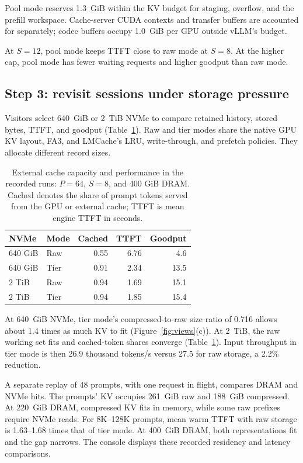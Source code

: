\documentclass[conference]{IEEEtran}
\begin{document}
Pool mode reserves 1.3~GiB within the KV budget for staging, overflow, and
the prefill workspace. Cache-server CUDA contexts and transfer buffers are
accounted for separately; codec buffers occupy 1.0~GiB per GPU outside
vLLM's budget.

At $S=12$, pool mode keeps TTFT close to raw mode at $S=8$.
At the higher cap, pool mode has fewer waiting requests and higher goodput
than raw mode.

\subsection{Step 3: revisit sessions under storage pressure}
Visitors select 640~GiB or 2~TiB NVMe to compare retained
history, stored bytes, TTFT, and goodput (Table~\ref{tab:tiers}). Raw and tier
modes share the native GPU KV layout, FA3, and LMCache's LRU, write-through,
and prefetch policies. They allocate different record sizes.

\begin{table}[t]
\centering
\caption{External cache capacity and performance in the recorded runs:
$P=64$, $S=8$, and 400 GiB DRAM. Cached denotes the share of prompt tokens
served from the GPU or external cache; TTFT is mean engine TTFT in seconds.}
\label{tab:tiers}
\small
\setlength{\tabcolsep}{3pt}
\begin{tabular*}{\columnwidth}{@{\extracolsep{\fill}}llrrr@{}}
\toprule
NVMe & Mode & Cached & TTFT & Goodput \\
\midrule
640 GiB & Raw  & 0.55 & 6.76 & 4.6 \\
640 GiB & Tier & 0.91 & 2.34 & 13.5 \\
2 TiB   & Raw  & 0.94 & 1.69 & 15.1 \\
2 TiB   & Tier & 0.94 & 1.85 & 15.4 \\
\bottomrule
\end{tabular*}
\end{table}

At 640~GiB NVMe, tier mode's compressed-to-raw size ratio of 0.716 allows
about 1.4 times as much KV to fit (Figure~\ref{fig:views}(c)). At 2~TiB, the raw
working set fits and cached-token shares converge (Table~\ref{tab:tiers}).
Input throughput in tier mode is then 26.9 thousand tokens/s versus 27.5
for raw storage, a 2.2\% reduction.

A separate replay of 48 prompts, with one request in flight, compares DRAM
and NVMe hits. The prompts' KV occupies 261~GiB raw and 188~GiB compressed. At
220~GiB DRAM, compressed KV fits in memory, while some raw prefixes require
NVMe reads. For 8K--128K prompts, mean warm TTFT with raw storage is
1.63--1.68 times that of tier mode. At 400~GiB DRAM, both representations
fit and the gap narrows.
The console displays these recorded residency and latency comparisons.
\end{document}
